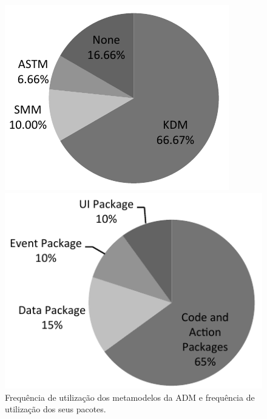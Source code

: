 \begin{figure}[!h]
\caption{Frequência de utilização dos metamodelos da ADM e frequência de utilização dos seus pacotes.}
 \label{fig:frequencia_kdm_packages}
\centering
\begin{minipage}{.5\textwidth}
  \centering
  \includegraphics[scale=0.9]{images/MetamodelosDIstribuition}
\end{minipage}%
\begin{minipage}{.5\textwidth}
  \centering
  \includegraphics[scale=0.9]{images/PacotesKDM}
\end{minipage}
\fautor
\end{figure}

